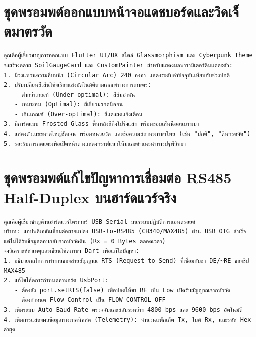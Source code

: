 \section{ชุดพรอมพต์ออกแบบหน้าจอแดชบอร์ดและวิดเจ็ตมาตรวัด}

\begin{promptbox}[title={พรอมพต์ ก.4: การสร้างวิดเจ็ตมาตรวัดวงกลม CustomPainter สไตล์โมเดิร์น}]
\begin{lstlisting}
คุณคือผู้เชี่ยวชาญการออกแบบ Flutter UI/UX สไตล์ Glassmorphism และ Cyberpunk Theme
จงสร้างคลาส SoilGaugeCard และ CustomPainter สำหรับแสดงผลพารามิเตอร์ดินแต่ละตัว:
1. มีวงแหวนความคืบหน้า (Circular Arc) 240 องศา แสดงระดับค่าปัจจุบันเทียบกับช่วงปกติ
2. ปรับเปลี่ยนสีเส้นโค้งเรืองแสงอัตโนมัติตามเกณฑ์ทางการเกษตร:
   - ต่ำกว่าเกณฑ์ (Under-optimal): สีส้มอำพัน
   - เหมาะสม (Optimal): สีเขียวมรกตนีออน
   - เกินเกณฑ์ (Over-optimal): สีแดงสดแจ้งเตือน
3. มีการ์ดแบบ Frosted Glass พื้นหลังสีกึ่งโปร่งแสง พร้อมขอบเส้นนีออนบางเบา
4. แสดงตัวเลขขนาดใหญ่ชัดเจน พร้อมหน่วยวัด และข้อความสถานะภาษาไทย (เช่น "ปกติ", "ดินกรดจัด")
5. รองรับการกดแตะเพื่อเปิดหน้าต่างแสดงกราฟแนวโน้มและคำแนะนำทางปฐพีวิทยา
\end{lstlisting}
\end{promptbox}

\section{ชุดพรอมพต์แก้ไขปัญหาการเชื่อมต่อ RS485 Half-Duplex บนฮาร์ดแวร์จริง}

\begin{promptbox}[title={พรอมพต์ ก.5: การแก้ปัญหาสายแปลง USB-RS485 มิวต์ตัวรับสัญญาณ (RTS DE/RE)}]
\begin{lstlisting}
คุณคือผู้เชี่ยวชาญด้านฮาร์ดแวร์ไดรเวอร์ USB Serial บนระบบปฏิบัติการแอนดรอยด์
บริบท: แอปพลิเคชันเชื่อมต่อสายแปลง USB-to-RS485 (CH340/MAX485) ผ่าน USB OTG สำเร็จ
แต่ไม่ได้รับข้อมูลตอบกลับจากหัววัดดิน (Rx = 0 Bytes ตลอดเวลา)
จงวิเคราะห์สาเหตุและเขียนโค้ดภาษา Dart เพื่อแก้ไขปัญหา:
1. อธิบายกลไกการทำงานของสายสัญญาณ RTS (Request to Send) ที่เชื่อมกับขา DE/~RE ของชิป MAX485
2. แก้ไขโค้ดการกำหนดค่าพอร์ต UsbPort:
   - ต้องสั่ง port.setRTS(false) เพื่อปลดให้ขา RE เป็น Low เปิดรับสัญญาณจากหัววัด
   - ต้องกำหนด Flow Control เป็น FLOW_CONTROL_OFF
3. เพิ่มระบบ Auto-Baud Rate ตรวจจับและสลับระหว่าง 4800 bps และ 9600 bps อัตโนมัติ
4. เพิ่มการแสดงผลข้อมูลทางเทคนิคสด (Telemetry): จำนวนแพ็กเก็ต Tx, ไบต์ Rx, และรหัส Hex ล่าสุด
\end{lstlisting}
\end{promptbox}
